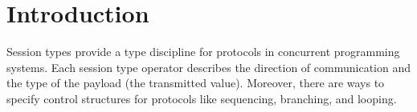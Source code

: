 \documentclass[acmsmall,review,anonymous,screen]{acmart}
\begin{document}




\maketitle

\section{Introduction}
\label{sec:introduction}



Session types provide a type discipline for protocols
in concurrent programming systems. Each session type operator
describes the direction of communication and the type of the
payload (the transmitted value). Moreover, there are ways to specify
control structures for protocols like sequencing, branching, and
looping.
\end{document}
